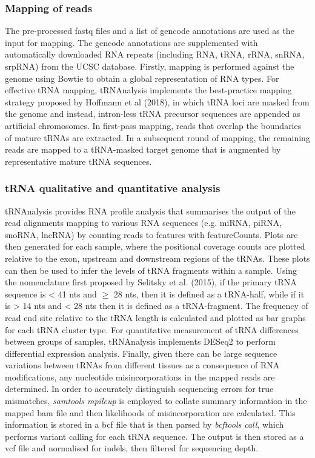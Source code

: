 \subsubsection{Mapping of reads}
The pre-processed fastq files and a list of gencode annotations are used as the input for mapping.
The gencode annotations are supplemented with automatically downloaded RNA repeats (including RNA, tRNA, rRNA, snRNA, srpRNA) from the UCSC database\cite{karolchik2004ucsc}.
Firstly, mapping is performed against the genome using Bowtie\cite{langmead2009ultrafast} to obtain a global representation of RNA types.
For effective tRNA mapping, tRNAnalysis implements the best-practice mapping strategy proposed by Hoffmann et al (2018), in which tRNA loci are masked from the genome and instead, intron-less tRNA precursor sequences are appended as artificial chromosomes\cite{hoffmann2018accurate}.
In first-pass mapping, reads that overlap the boundaries of mature tRNAs are extracted.
In a subsequent round of mapping, the remaining reads are mapped to a tRNA-masked target genome that is augmented by representative mature tRNA sequences.

\subsubsection{tRNA qualitative and quantitative analysis}
tRNAnalysis provides RNA profile analysis that summarises the output of the read alignments mapping to various RNA sequences (e.g. miRNA, piRNA, snoRNA, lncRNA) by counting reads to features with featureCounts\cite{liao2014featurecounts}.
Plots are then generated for each sample, where the positional coverage counts are plotted relative to the exon, upstream and downstream regions of the tRNAs.
These plots can then be used to infer the levels of tRNA fragments within a sample.
Using the nomenclature first proposed by Selitsky et al. (2015), if the primary tRNA sequence is < 41 nts and $\geq$ 28 nts, then it is defined as a tRNA-half, while if it is > 14 nts and < 28 nts then it is defined as a tRNA-fragment\cite{selitsky2015small}.
The frequency of read end site relative to the tRNA length is calculated and plotted as bar graphs for each tRNA cluster type.
For quantitative measurement of tRNA differences between groups of samples, tRNAnalysis implements DESeq2 to perform differential expression analysis\cite{love2014moderated}.
Finally, given there can be large sequence variations between tRNAs from different tissues as a consequence of RNA modifications\cite{hoffmann2018accurate, vilmi2005sequence, lin2019trnaviz}, any nucleotide misincorporations in the mapped reads are determined.
In order to accurately distinguish sequencing errors for true mismatches, \textit{samtools mpileup} is employed to collate summary information in the mapped bam file and then likelihoods of misincorporation are calculated.
This information is stored in a bcf file that is then parsed by \textit{bcftools call}, which performs variant calling for each tRNA sequence\cite{li2009sequence}.
The output is then stored as a vcf file and normalised for indels, then filtered for sequencing depth.

